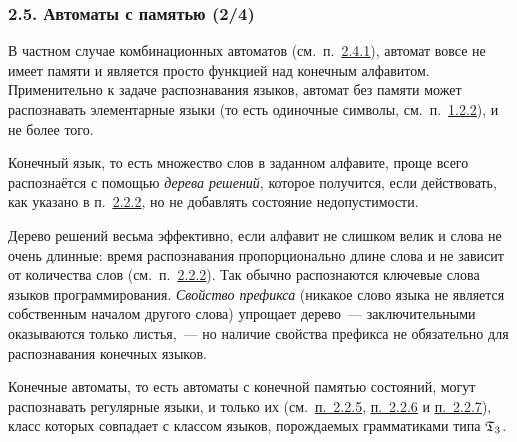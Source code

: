 \documentclass[mathserif,12pt,aspectratio=169]{beamer}
\renewcommand{\index}[1]{}
\def\odmkey#1#2{{\it\color{red} #1}\index{#2}}
\def\DMref#1#2{{\color{blue}\underline{\hyperlink{#2}{#1}}}}
\begin{document}
\begin{frame}
\frametitle{2.5. Автоматы с памятью (2/4)}

В частном случае комбинационных автоматов (см.~п.~\DMref{2.4.1}{2.4.1.}),
автомат вовсе не имеет памяти и является просто функцией над конечным
алфавитом. Применительно к задаче распознавания языков, автомат без памяти может
распознавать элементарные языки (то есть одиночные символы,
см.~п.~\DMref{1.2.2}{1.2.2.}), и не более того.
\smallskip

Конечный язык, то есть множество слов в заданном алфавите, проще всего
распознаётся с помощью \odmkey{дерева решений}{Дерево!решений}, которое получится, если действовать, как
указано в п.~\DMref{2.2.2}{2.2.2.}, но не добавлять состояние недопустимости.

\begin{remark}
Дерево решений весьма эффективно, если алфавит не слишком велик и слова не очень
длинные: время распознавания пропорционально длине слова и не зависит от
количества слов (см.~п.~\DMref{2.2.2}{2.2.2.}). Так обычно распознаются
ключевые слова языков программирования. \odmkey{Свойство префикса}{Свойство!префикса} (никакое слово
языка не является собственным началом другого слова) упрощает дерево~---
заключительными оказываются только листья,~--- но наличие свойства префикса не обязательно для распознавания конечных языков.
\end{remark}

Конечные автоматы, то есть автоматы с конечной памятью состояний, могут
распознавать регулярные языки, и только их (см.~\DMref{п.~2.2.5}{2.2.5.},
\DMref{п.~2.2.6}{2.2.6.} и \DMref{п.~2.2.7}{2.2.7.}), класс которых совпадает
с классом языков, порождаемых грамматиками типа $\frak{T}_3$.
\end{frame}
\end{document}
